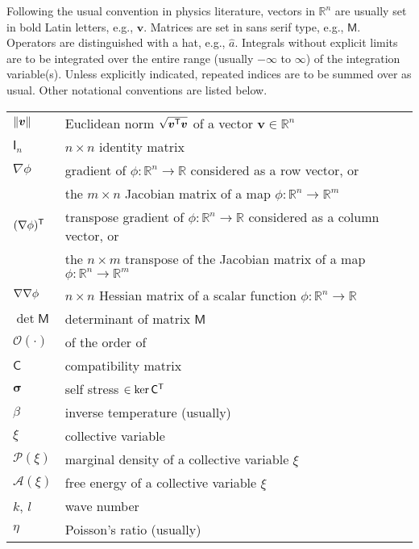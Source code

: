 
Following the usual convention in physics literature, vectors in $\mathbb{R}^{n}$ are usually set in bold Latin letters, e.g., $\bm{v}$.
Matrices are set in \textsf{sans serif} type, e.g., $\mathsf{M}$.
Operators are distinguished with a hat, e.g., $\hat{a}$.
Integrals without explicit limits are to be integrated over the entire range (usually $-\infty$ to $\infty$) of the integration variable(s).
Unless explicitly indicated, repeated indices are to be summed over as usual.
Other notational conventions are listed below.\\

\begin{tabular}{ll}
  $\lVert\bm{v}\rVert$ & Euclidean norm $\sqrt{\bm{v}^\mathsf{T}\bm{v}}$ of a vector $\bm{v} \in \mathbb{R}^{n}$\\
  $\mathsf{I}_n$ & $n\times n$ identity matrix\\
  $\nabla \phi$ & gradient of $\phi: \mathbb{R}^n \to \mathbb{R}$ considered as a row vector, or\\
                & the $m\times n$ Jacobian matrix of a map $\phi: \mathbb{R}^n \to \mathbb{R}^m$\\
  $(\nabla\phi)^\mathsf{T}$ & transpose gradient of $\phi: \mathbb{R}^n \to \mathbb{R}$ considered as a column vector, or\\
                & the $n\times m$ transpose of the Jacobian matrix of a map $\phi: \mathbb{R}^n \to \mathbb{R}^m$\\
  $\nabla\nabla \phi$ & $n\times n$ Hessian matrix of a scalar function $\phi: \mathbb{R}^n \to \mathbb{R}$\\
  $\det\mathsf{M}$ & determinant of matrix $\mathsf{M}$\\
  $\mathcal{O}(\cdot)$ & of the order of\\
  $\mathsf{C}$ & compatibility matrix\\
  $\bm{\sigma}$ & self stress $\in \ker\mathsf{C}^\mathsf{T}$\\
  $\beta$ & inverse temperature (usually)\\
  $\xi$ & collective variable\\
  $\mathscr{P}(\xi)$ & marginal density of a collective variable $\xi$\\
  $\mathscr{A}(\xi)$ & free energy of a collective variable $\xi$\\
  $k$, $l$ & wave number\\
  $\eta$ & Poisson's ratio (usually)
\end{tabular}

